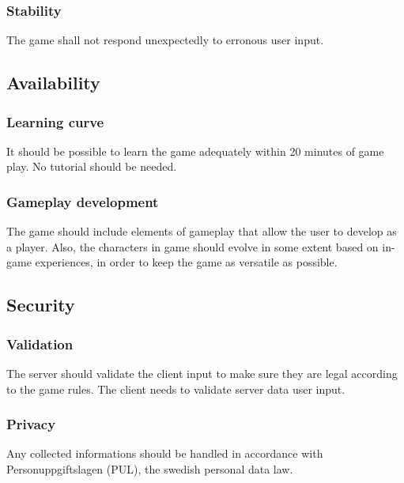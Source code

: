 
\subsubsection{Stability}
The game shall not respond unexpectedly to erronous user input.


\subsection{Availability}
\subsubsection{Learning curve}
It should be possible to learn the game adequately within 20 minutes of game play. No tutorial should be needed.


\subsubsection{Gameplay development}
The game should include elements of gameplay that allow the user to develop as a player. Also, the characters in game should evolve in some extent based on in-game experiences, in order to keep the game as versatile as possible.


\subsection{Security}
\subsubsection{Validation}
\label{cheating}
The server should validate the client input to make sure they are legal according to the game rules. The client needs to validate server data user input. 


\subsubsection{Privacy}
Any collected informations should be handled in accordance with Personuppgiftslagen (PUL), the swedish personal data law.

